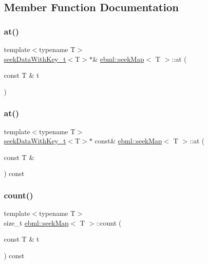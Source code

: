 \subsection{Member Function Documentation}
\mbox{\label{classebml_1_1seekMap_af99606cf546d3e99e6445a0baf5a6cad}} 
\subsubsection{\texorpdfstring{at()}{at()}\hspace{0.1cm}{\footnotesize\ttfamily [1/2]}}
{\footnotesize\ttfamily template$<$typename T$>$ \\
\mbox{\hyperlink{classebml_1_1seekDataWithKey__t}{seek\+Data\+With\+Key\+\_\+t}}$<$T$>$$\ast$\& \mbox{\hyperlink{classebml_1_1seekMap}{ebml\+::seek\+Map}}$<$ T $>$\+::at (\begin{DoxyParamCaption}\item[{const T \&}]{t }\end{DoxyParamCaption})}

\mbox{\label{classebml_1_1seekMap_a4ec29d60a1d8b8edd825499dc87498b1}} 
\subsubsection{\texorpdfstring{at()}{at()}\hspace{0.1cm}{\footnotesize\ttfamily [2/2]}}
{\footnotesize\ttfamily template$<$typename T$>$ \\
\mbox{\hyperlink{classebml_1_1seekDataWithKey__t}{seek\+Data\+With\+Key\+\_\+t}}$<$T$>$$\ast$ const\& \mbox{\hyperlink{classebml_1_1seekMap}{ebml\+::seek\+Map}}$<$ T $>$\+::at (\begin{DoxyParamCaption}\item[{const T \&}]{ }\end{DoxyParamCaption}) const}

\mbox{\label{classebml_1_1seekMap_aa23bfd6f97470e3961143475031e84bd}} 
\subsubsection{\texorpdfstring{count()}{count()}}
{\footnotesize\ttfamily template$<$typename T$>$ \\
size\+\_\+t \mbox{\hyperlink{classebml_1_1seekMap}{ebml\+::seek\+Map}}$<$ T $>$\+::count (\begin{DoxyParamCaption}\item[{const T \&}]{t }\end{DoxyParamCaption}) const}

